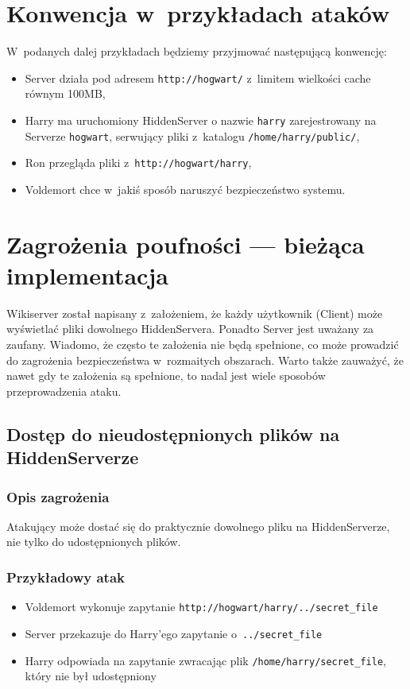 \documentclass[a4paper,notitlepage]{article}
\begin{document}
\pagestyle{fancy}

\section{Konwencja w~przykładach ataków}
W~podanych dalej przykładach będziemy przyjmować następującą konwencję:
\begin{itemize}
\item Server działa pod adresem \texttt{http://hogwart/} 
z~limitem wielkości cache równym 100MB,
\item Harry ma uruchomiony HiddenServer o nazwie \texttt{harry} 
zarejestrowany na Serverze \texttt{hogwart},
serwujący pliki z~katalogu \texttt{/home/harry/public/},
\item Ron przegląda pliki z~\texttt{http://hogwart/harry},
\item Voldemort chce w~jakiś sposób naruszyć bezpieczeństwo systemu.
\end{itemize}

\section{Zagrożenia poufności --- bieżąca implementacja}
Wikiserver został napisany z~założeniem, że każdy użytkownik (Client) może
wyświetlać pliki dowolnego HiddenServera. Ponadto Server jest uważany 
za zaufany. Wiadomo, że często te założenia nie będą spełnione, co
może prowadzić do zagrożenia bezpieczeństwa w~rozmaitych obszarach.
Warto także zauważyć, że nawet gdy te założenia są spełnione, to nadal
jest wiele sposobów przeprowadzenia ataku. 

\subsection{Dostęp do nieudostępnionych plików na HiddenServerze}
\subsubsection*{Opis zagrożenia}
Atakujący może dostać się do praktycznie dowolnego pliku na HiddenServerze,
nie tylko do udostępnionych plików.
\subsubsection*{Przykładowy atak}
\begin{itemize}
\item Voldemort wykonuje zapytanie 
\texttt{http://hogwart/harry/../secret\_file}
\item Server przekazuje do Harry'ego zapytanie o~\texttt{../secret\_file}
\item Harry odpowiada na zapytanie zwracając plik 
\texttt{/home/harry/secret\_file}, który nie był udostępniony
\end{itemize}
\end{document}
